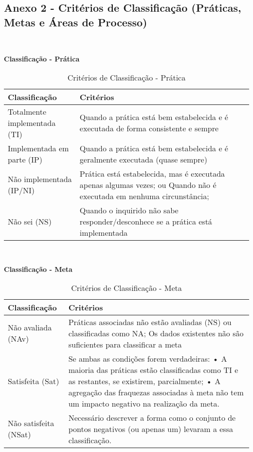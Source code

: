 \documentclass[openany,10pt,a4paper]{article}
\begin{document}
\begin{appendix}
\subsection{Anexo 2 - Critérios de Classificação (Práticas, Metas e Áreas de Processo)}
\\
\begin{table}[h]
	\textbf{Classificação - Prática}
		\centering
		\caption{Critérios de Classificação - Prática}
		\begin{tabular}{p{5in}p{1in}}		
			\toprule
			\textbf{Classificação}  & \textbf{Critérios}\\ 
			\midrule
			Totalmente implementada	(TI) & Quando a prática está bem estabelecida e é executada de forma
			consistente e sempre \\
			\midrule
			Implementada em parte (IP) & Quando a prática está bem estabelecida e é geralmente executada
			(quase sempre) \\
			\midrule
			Não implementada (IP/NI) & Prática está estabelecida, mas é executada apenas algumas vezes; ou
			Quando não é executada em nenhuma circunstância; \\
			\midrule
			Não sei (NS) & Quando o inquirido não sabe responder/desconhece se a prática está
			implementada \\
			\bottomrule
		\end{tabular} 
\end{table}
\\
\begin{table}[h]
	\textbf{Classificação - Meta}
		\centering
		\caption{Critérios de Classificação - Meta}
		\begin{tabular}{p{5in}p{1in}}		
			\toprule
			\textbf{Classificação}  & \textbf{Critérios}\\ 
			\midrule
			Não avaliada (NAv) & Práticas associadas não estão avaliadas (NS) ou classificadas como NA;
			Os dados existentes não são suficientes para classificar a meta \\
			\midrule
			Satisfeita (Sat) & Se ambas as condições forem verdadeiras:
			• A maioria das práticas estão classificadas como TI e as restantes,
			se existirem, parcialmente;
			• A agregação das fraquezas associadas à meta não tem um impacto
			negativo na realização da meta.	 \\
			\midrule
			Não satisfeita (NSat) & Necessário descrever a forma como o conjunto de pontos negativos
			(ou apenas um) levaram a essa classificação. \\
			\bottomrule
		\end{tabular} 

\end{table}
\end{appendix}
\end{document}
